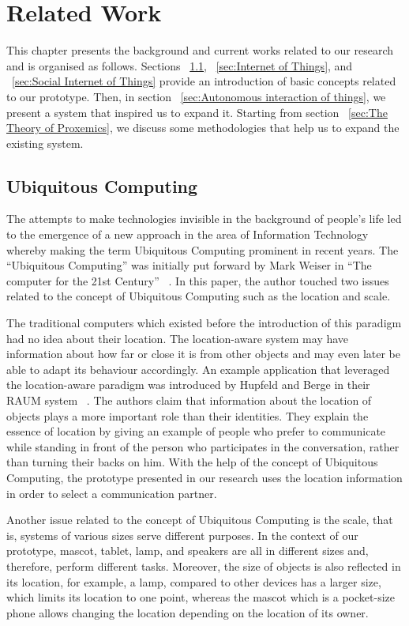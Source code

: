 \chapter{Related Work}
\label{ch:related-work}
This chapter presents the background and current works related to our research and is organised as follows.
Sections ~\ref{sec:Ubiquitous Computing}, ~\ref{sec:Internet of Things}, and ~\ref{sec:Social Internet of Things}
provide an introduction of basic concepts related to our prototype.
Then, in section ~\ref{sec:Autonomous interaction of things}, we present a system that inspired us to expand it.
Starting from section ~\ref{sec:The Theory of Proxemics}, we discuss some methodologies
that help us to expand the existing system.

\section{Ubiquitous Computing}
\label{sec:Ubiquitous Computing}
The attempts to make technologies invisible in the background of people’s life led to the emergence
of a new approach in the area of Information Technology whereby making the term
Ubiquitous Computing prominent in recent years.
The “Ubiquitous Computing” was initially put forward by Mark Weiser
in “The computer for the 21st Century” ~\cite{weiser2002computer}.
In this paper, the author touched two issues related to the concept of
Ubiquitous Computing such as the location and scale.

The traditional computers which existed before the introduction of this
paradigm had no idea about their location.
The location-aware system may have information about how far or close it is from other
objects and may even later be able to adapt its behaviour accordingly.
An example application that leveraged the location-aware paradigm was introduced by
Hupfeld and Berge in their RAUM system ~\cite{hupfeld2000spatially}.
The authors claim that information about the location of objects plays
a more important role than their identities.
They explain the essence of location by giving an example of people who prefer to communicate
while standing in front of the person who participates in the conversation, rather than turning their backs on him.
With the help of the concept of Ubiquitous Computing, the prototype presented in our
research uses the location information in order to select a communication partner.

Another issue related to the concept of Ubiquitous Computing is the scale,
that is, systems of various sizes serve different purposes.
In the context of our prototype, mascot, tablet, lamp, and speakers are all in
different sizes and, therefore, perform different tasks.
Moreover, the size of objects is also reflected in its location, for example, a lamp, compared
to other devices has a larger size, which limits its location to one point, whereas the mascot
which is a pocket-size phone allows changing the location depending on the location of its owner.

